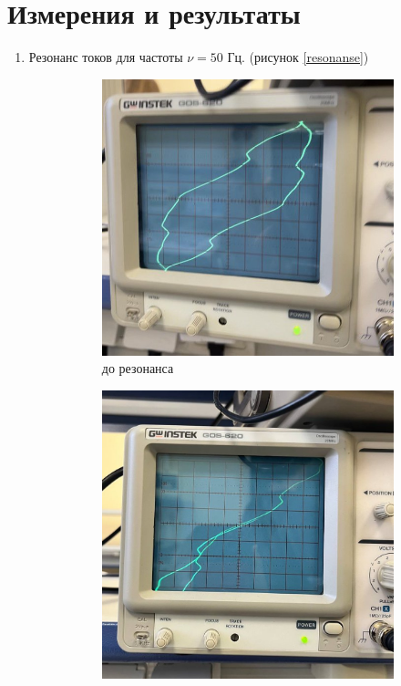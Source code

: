 \documentclass[a4paper, 12pt]{article}
\begin{document}
\section*{Измерения и результаты}
\begin{enumerate}
    \item Резонанс токов для частоты $\nu = 50$ Гц. (рисунок \ref{resonanse})
    \begin{figure}[htbp]
        \centering
        \begin{subfigure}{0.3\textwidth}
            \includegraphics[width=\textwidth]{ellipse.jpg}
            \caption{до резонанса}
            \label{ellipse}
        \end{subfigure}
        \qquad
        \begin{subfigure}{0.3\textwidth}
            \includegraphics[width=\textwidth]{resonanse.jpeg}

\end{subfigure}
\end{figure}
\end{enumerate}
\end{document}
